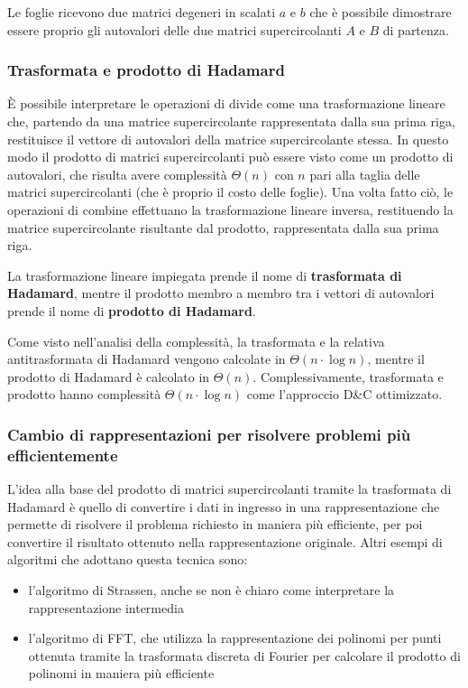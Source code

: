 Le foglie ricevono due matrici degeneri in scalati \(a\) e \(b\) che è possibile dimostrare essere proprio gli autovalori
delle due matrici supercircolanti \(A\) e \(B\) di partenza.

\subsubsection*{Trasformata e prodotto di Hadamard}
È possibile interpretare le operazioni di divide come una trasformazione lineare che, partendo da una matrice supercircolante
rappresentata dalla sua prima riga, restituisce il vettore di autovalori della matrice supercircolante stessa. In questo modo
il prodotto di matrici supercircolanti può essere visto come un prodotto di autovalori, che risulta avere complessità
\(\Theta(n)\) con \(n\) pari alla taglia delle matrici supercircolanti (che è proprio il costo delle foglie). Una volta fatto
ciò, le operazioni di combine effettuano la trasformazione lineare inversa, restituendo la matrice supercircolante risultante
dal prodotto, rappresentata dalla sua prima riga.

La trasformazione lineare impiegata prende il nome di \textbf{trasformata di Hadamard}, mentre il prodotto membro a membro
tra i vettori di autovalori prende il nome di \textbf{prodotto di Hadamard}.

Come visto nell'analisi della complessità, la trasformata e la relativa antitrasformata di Hadamard vengono calcolate in
\(\Theta(n \cdot \log n)\), mentre il prodotto di Hadamard è calcolato in \(\Theta(n)\). Complessivamente, trasformata e
prodotto hanno complessità \(\Theta(n \cdot \log n)\) come l'approccio D\&C ottimizzato.

\subsubsection*{Cambio di rappresentazioni per risolvere problemi più efficientemente}
L'idea alla base del prodotto di matrici supercircolanti tramite la trasformata di Hadamard è quello di convertire i dati
in ingresso in una rappresentazione che permette di risolvere il problema richiesto in maniera più efficiente, per poi
convertire il risultato ottenuto nella rappresentazione originale. Altri esempi di algoritmi che adottano questa tecnica sono:
\begin{itemize}
	\item l'algoritmo di Strassen, anche se non è chiaro come interpretare la rappresentazione intermedia
	\item l'algoritmo di FFT, che utilizza la rappresentazione dei polinomi per punti ottenuta tramite la trasformata discreta
	di Fourier per calcolare il prodotto di polinomi in maniera più efficiente
\end{itemize}

